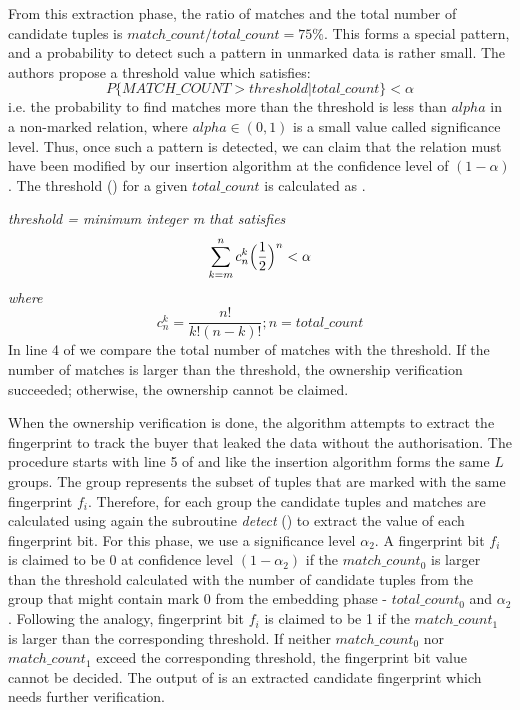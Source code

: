 From this extraction phase, the ratio of matches and the total number of candidate tuples is $match\_count/total\_count=75\%$. 
This forms a special pattern, and a probability to detect such a pattern in unmarked data is rather small.
The authors propose a threshold value which satisfies:
\begin{equation}
    P\{MATCH\_COUNT > threshold | total\_count\} < \alpha
\end{equation}
i.e. the probability to find matches more than the threshold is less than $alpha$ in a non-marked relation, where $alpha\in(0,1)$ is a small value called significance level. 
Thus, once such a pattern is detected, we can claim that the relation must have been modified by our insertion algorithm at the confidence level of $(1-\alpha)$.
The threshold () for a given $total\_count$ is calculated as .

\textit{threshold = minimum integer m that satisfies}
\begin{equation}
\label{eq:threshold}
    \sum_{k=m}^{n}c_n^k\Big(\frac{1}{2}\Big)^n<\alpha \\
\end{equation}
\textit{where}
\begin{equation}
    c_n^k=\frac{n!}{k!(n-k)!} ; n=total\_count
\end{equation}
In line 4 of  we compare the total number of matches with the threshold. 
If the number of matches is larger than the threshold, the ownership verification succeeded; otherwise, the ownership cannot be claimed.

When the ownership verification is done, the algorithm attempts to extract the fingerprint to track the buyer that leaked the data without the authorisation.
The procedure starts with line 5 of  and like the insertion algorithm forms the same $L$ groups. 
The group represents the subset of tuples that are marked with the same fingerprint $f_i$.
Therefore, for each group the candidate tuples and matches are calculated using again the subroutine \textit{detect} () to extract the value of each fingerprint bit. 
For this phase, we use a significance level $\alpha_2$. 
A fingerprint bit $f_i$ is claimed to be 0 at confidence level $(1-\alpha_2)$ if the $match\_count_0$ is larger than the threshold calculated with the number of candidate tuples from the group that might contain mark $0$ from the embedding phase - $total\_count_0$ and $\alpha_2$. 
Following the analogy, fingerprint bit $f_i$ is claimed to be 1 if the $match\_count_1$ is larger than the corresponding threshold.
If neither $match\_count_0$ nor $match\_count_1$ exceed the corresponding threshold, the fingerprint bit value cannot be decided. 
The output of  is an extracted candidate fingerprint which needs further verification. 

